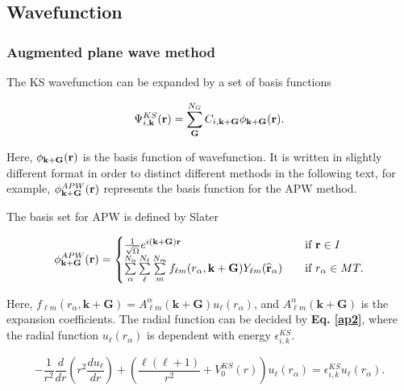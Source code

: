 \documentclass[a4paper, 12pt, titlepage,oneside,drop]{kthesis}
\begin{document}
\subsection{Wavefunction}
\subsubsection{Augmented plane wave method}

The KS wavefunction can be expanded by a set of basis functions 

\begin{equation}\label{wavefunctions}
 \Psi^{KS}_{i,\textbf{k}}(\textbf{r}) = \sum\limits_{\textbf{G}}^{N_G} C_{i,\textbf{k}+\textbf{G}}\phi_{\textbf {k}+\textbf{G}} ({\textbf r}).
\end{equation}

Here, $\phi_{\textbf {k}+\textbf{G}} ({\textbf r})$ is the basis function of wavefunction. It is written in slightly different format in order to distinct different methods in the following text, for example, 
$\phi^{APW}_{\textbf {k}+\textbf{G}}({\textbf r})$ represents the basis function for the APW method.

The basis set for APW is defined by Slater

\begin{equation}\label{ap111}
\phi^{APW}_{\textbf {k}+\textbf{G}} ({\textbf r}) = 
\begin{cases} \frac {1}{\sqrt{\Omega}} e^{i({ \textbf {k}+\textbf{G}}) {\textbf r}} & \quad \mbox{if ${\textbf r} \in I $} 
\\
\sum\limits_{\alpha}^{N_{\alpha}} \sum\limits_{{\ell}}^{N_{\ell}} \sum\limits_{{m}}^{N_{m}} f_{{\ell}{m}} (r_{\alpha},{\textbf {k}+\textbf{G}}) Y_{{\ell}m}(\widehat{{\textbf r}}_{\alpha})  & \quad \mbox{if $ r_{\alpha} \in MT. $}\\ 
\end{cases}
\end{equation}

Here, $f_{{\ell}{m}} (r_{\alpha},\textbf{k}+\textbf{G}) =  A _{{\ell}m}^{\alpha} ( \textbf {k}+\textbf{G}) u_{{\ell}}(r_{\alpha})$, and $A _{{\ell}m}^{\alpha} (\textbf {k}+\textbf{G}) $ is the 
expansion coefficients. The radial function can be decided by \textbf{Eq. \ref{ap2}}, where the radial function $u_{{\ell}} (r_{\alpha})$ is dependent with energy $\epsilon_{i,k}^{KS}$.

\begin{equation}\label{ap2}
-\frac{1}{r^2}  \frac{d}{dr} (r^2 \frac{du_{\ell}}{dr})+ \left(\frac{\ell(\ell+1)}{r^2}+V^{KS}_0({r})\right)u_{\ell}(r_{\alpha}) = \epsilon_{i,k}^{KS} u_{\ell}(r_{\alpha}).
\end{equation}
\end{document}
